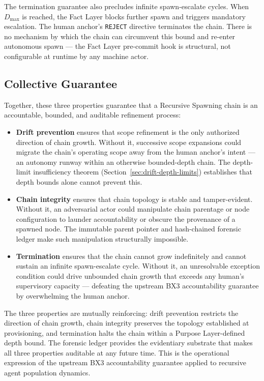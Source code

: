 The termination guarantee also precludes infinite spawn-escalate cycles. When $D_{\mathrm{max}}$ is reached, the Fact Layer blocks further spawn and triggers mandatory escalation. The human anchor's \texttt{REJECT} directive terminates the chain. There is no mechanism by which the chain can circumvent this bound and re-enter autonomous spawn --- the Fact Layer pre-commit hook is structural, not configurable at runtime by any machine actor.

\subsection{Collective Guarantee}
\label{sec:rs-collective-guarantee}

Together, these three properties guarantee that a Recursive Spawning chain is an accountable, bounded, and auditable refinement process:

\begin{itemize}
  \item \textbf{Drift prevention} ensures that scope refinement is the only authorized direction of chain growth. Without it, successive scope expansions could migrate the chain's operating scope away from the human anchor's intent --- an autonomy runway within an otherwise bounded-depth chain. The depth-limit insufficiency theorem (Section~\ref{sec:drift-depth-limits}) establishes that depth bounds alone cannot prevent this.

  \item \textbf{Chain integrity} ensures that chain topology is stable and tamper-evident. Without it, an adversarial actor could manipulate chain parentage or node configuration to launder accountability or obscure the provenance of a spawned node. The immutable parent pointer and hash-chained forensic ledger make such manipulation structurally impossible.

  \item \textbf{Termination} ensures that the chain cannot grow indefinitely and cannot sustain an infinite spawn-escalate cycle. Without it, an unresolvable exception condition could drive unbounded chain growth that exceeds any human's supervisory capacity --- defeating the upstream BX3 accountability guarantee by overwhelming the human anchor.
\end{itemize}

The three properties are mutually reinforcing: drift prevention restricts the direction of chain growth, chain integrity preserves the topology established at provisioning, and termination halts the chain within a Purpose Layer-defined depth bound. The forensic ledger provides the evidentiary substrate that makes all three properties auditable at any future time. This is the operational expression of the upstream BX3 accountability guarantee applied to recursive agent population dynamics.
